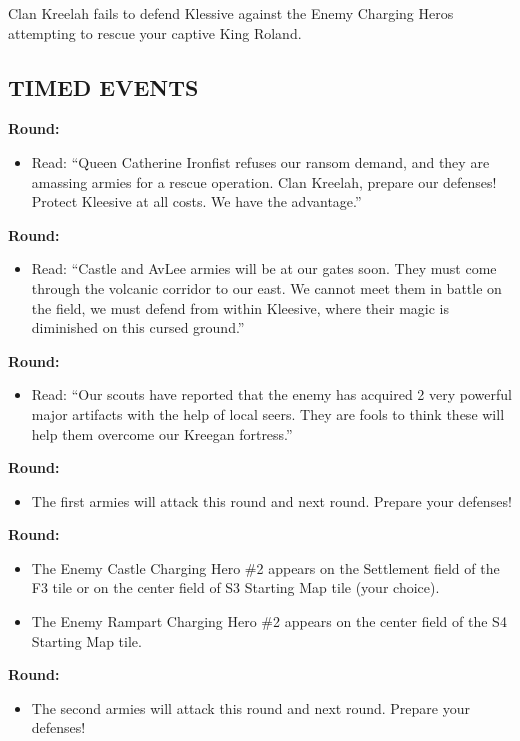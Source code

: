 \begin{multicols*}{2}
Clan Kreelah fails to defend Klessive against the Enemy Charging Heros attempting to rescue your captive King Roland.

\subsection*{\MakeUppercase{Timed Events}}

\textbf{ Round:}
\begin{itemize}
  \item Read: ``Queen Catherine Ironfist refuses our ransom demand, and they are amassing armies for a rescue
    operation. Clan Kreelah, prepare our defenses! Protect Kleesive at all costs. We have the advantage.''
\end{itemize}

\textbf{ Round:}
\begin{itemize}
  \item Read: ``Castle and AvLee armies will be at our gates soon. They must come through the volcanic corridor
    to our east. We cannot meet them in battle on the field, we must defend from within Kleesive, where
    their magic is diminished on this cursed ground.''
\end{itemize}

\textbf{ Round:}
\begin{itemize}
  \item Read: ``Our scouts have reported that the enemy has acquired 2 very powerful major artifacts with the
    help of local seers. They are fools to think these will help them overcome our Kreegan fortress.”
\end{itemize}

\textbf{ Round:}
\begin{itemize}
  \item The first armies will attack this round and next round. Prepare your defenses!
\end{itemize}

\textbf{ Round:}
\begin{itemize}
  \item The Enemy Castle Charging Hero \#2 appears on the Settlement field of the F3 tile or on the center field of S3 Starting Map tile (your choice).
  \item The Enemy Rampart Charging Hero \#2 appears on the center field of the S4 Starting Map tile.
\end{itemize}

\textbf{ Round:}
\begin{itemize}
  \item The second armies will attack this round and next round. Prepare your defenses!
\end{itemize}



\end{multicols*}
